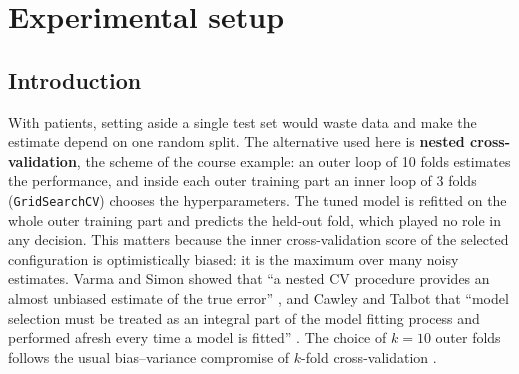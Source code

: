 \section{Experimental setup}\label{sec:prdl-setup}

\subsection{Introduction}

With \NClean{} patients, setting aside a single test set would waste data and make the estimate
depend on one random split. The alternative used here is \textbf{nested cross-validation}, the scheme
of the course example: an outer loop of 10 folds estimates the performance, and inside each outer
training part an inner loop of 3 folds (\texttt{GridSearchCV}) chooses the hyperparameters. The tuned
model is refitted on the whole outer training part and predicts the held-out fold, which played no
role in any decision. This matters because the inner cross-validation score of the selected
configuration is optimistically biased: it is the maximum over many noisy estimates. Varma and Simon
showed that ``a nested CV procedure provides an almost unbiased estimate of the true error''
\cite{varma2006}, and Cawley and Talbot that ``model selection must be treated as an integral part of
the model fitting process and performed afresh every time a model is fitted'' \cite{cawley2010}.
The choice of $k = 10$ outer folds follows the usual bias--variance compromise of $k$-fold
cross-validation \cite{james2021}.

